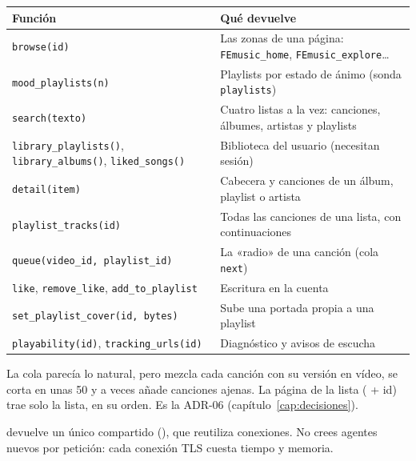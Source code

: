 \begin{center}
\small
\begin{tabularx}{\linewidth}{@{}lX@{}}
\toprule
Función & Qué devuelve \\
\midrule
\texttt{browse(id)} & Las zonas de una página: \texttt{FEmusic\_home}, \texttt{FEmusic\_explore}\dots \\
\texttt{mood\_playlists(n)} & Playlists por estado de ánimo (sonda \texttt{playlists}) \\
\texttt{search(texto)} & Cuatro listas a la vez: canciones, álbumes, artistas y playlists \\
\texttt{library\_playlists()}, \texttt{library\_albums()}, \texttt{liked\_songs()} & Biblioteca del usuario (necesitan sesión) \\
\texttt{detail(item)} & Cabecera y canciones de un álbum, playlist o artista \\
\texttt{playlist\_tracks(id)} & Todas las canciones de una lista, con continuaciones \\
\texttt{queue(video\_id, playlist\_id)} & La «radio» de una canción (cola \texttt{next}) \\
\texttt{like}, \texttt{remove\_like}, \texttt{add\_to\_playlist} & Escritura en la cuenta \\
\texttt{set\_playlist\_cover(id, bytes)} & Sube una portada propia a una playlist \\
\texttt{playability(id)}, \texttt{tracking\_urls(id)} & Diagnóstico y avisos de escucha \\
\bottomrule
\end{tabularx}
\end{center}

\begin{porque}
La cola  parecía lo natural, pero mezcla cada canción con su versión en vídeo, se
corta en unas 50 y a veces añade canciones ajenas. La página de la lista ( + id) trae
solo la lista, en su orden. Es la ADR-06 (capítulo~\ref{cap:decisiones}).
\end{porque}

\begin{trampa}
 devuelve un único  compartido (), que reutiliza
conexiones. No crees agentes nuevos por petición: cada conexión TLS cuesta tiempo y memoria.
\end{trampa}

